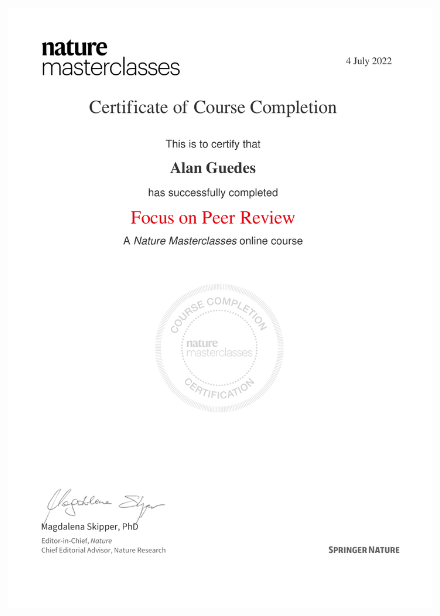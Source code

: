 \documentclass[10pt,a4paper,sans,colorlinks]{moderncv}
\begin{document}
\begin{figure}
    \centering
    \includegraphics[align=t,width=\textwidth,height=0.4\paperheight, keepaspectratio=true]{certificates/ucl-training/Focus_on_Peer_Review.pdf}

\end{figure}
\end{document}
